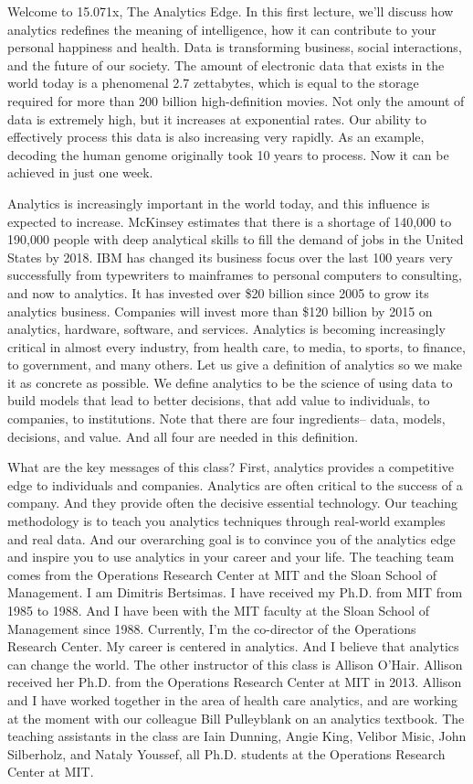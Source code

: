 
Welcome to 15.071x, The Analytics Edge.
In this first lecture, we'll discuss how analytics redefines
the meaning of intelligence, how it can contribute
to your personal happiness and health.
Data is transforming business, social interactions,
and the future of our society.
The amount of electronic data that exists in the world today
is a phenomenal 2.7 zettabytes, which
is equal to the storage required for more than 200
billion high-definition movies.
Not only the amount of data is extremely high,
but it increases at exponential rates.
Our ability to effectively process this data
is also increasing very rapidly.
As an example, decoding the human genome
originally took 10 years to process.
Now it can be achieved in just one week.

Analytics is increasingly important in the world today,
and this influence is expected to increase.
McKinsey estimates that there is a shortage
of 140,000 to 190,000 people with deep analytical skills
to fill the demand of jobs in the United States by 2018.
IBM has changed its business focus over the last 100 years
very successfully from typewriters to mainframes
to personal computers to consulting, and now
to analytics.
It has invested over \$20 billion since 2005
to grow its analytics business.
Companies will invest more than \$120 billion
by 2015 on analytics, hardware, software, and services.
Analytics is becoming increasingly critical
in almost every industry, from health care,
to media, to sports, to finance, to government, and many others.
Let us give a definition of analytics
so we make it as concrete as possible.
We define analytics to be the science of using data
to build models that lead to better decisions, that
add value to individuals, to companies, to institutions.
Note that there are four ingredients-- data, models,
decisions, and value.
And all four are needed in this definition.

What are the key messages of this class?
First, analytics provides a competitive edge
to individuals and companies.
Analytics are often critical to the success of a company.
And they provide often the decisive essential technology.
Our teaching methodology is to teach you analytics techniques
through real-world examples and real data.
And our overarching goal is to convince you of the analytics
edge and inspire you to use analytics
in your career and your life.
The teaching team comes from the Operations Research
Center at MIT and the Sloan School of Management.
I am Dimitris Bertsimas.
I have received my Ph.D. from MIT from 1985 to 1988.
And I have been with the MIT faculty
at the Sloan School of Management since 1988.
Currently, I'm the co-director of the Operations Research
Center.
My career is centered in analytics.
And I believe that analytics can change the world.
The other instructor of this class is Allison O'Hair.
Allison received her Ph.D. from the Operations Research Center
at MIT in 2013.
Allison and I have worked together
in the area of health care analytics,
and are working at the moment with our colleague Bill
Pulleyblank on an analytics textbook.
The teaching assistants in the class
are Iain Dunning, Angie King, Velibor Misic, John Silberholz,
and Nataly Youssef, all Ph.D. students at the Operations
Research Center at MIT.

